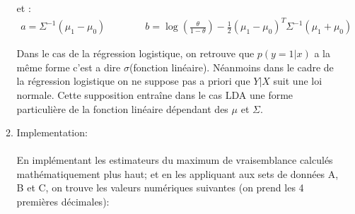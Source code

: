 \documentclass{article}
\begin{document}
\begin{enumerate}
\begin{enumerate}[label=(\alph*)]
et :
\begin{align*} 
a=\Sigma^{-1}(\mu_1-\mu_0) \qquad \qquad b=\log(\frac{\theta}{1-\theta})- \frac{1}{2}(\mu_1-\mu_0)^T\Sigma^{-1}(\mu_1+\mu_0)
\end{align*}

Dans le cas de la régression logistique, on retrouve que $p(y=1|x)$ a la même forme c'est a dire $\sigma$(fonction linéaire). Néanmoins dans le cadre de la régression logistique on ne suppose pas a priori que $Y|X$ suit une loi normale. Cette supposition entraîne dans le cas LDA une forme particulière de la fonction linéaire dépendant des $\mu$ et $\Sigma$.
\\
\item Implementation:\\
\\En implémentant les estimateurs du maximum de vraisemblance calculés mathématiquement plus haut; et en les appliquant aux sets de données A, B et C, on trouve les valeurs numériques suivantes (on prend les 4 premières décimales):



\end{enumerate}
\end{enumerate}
\end{document}
